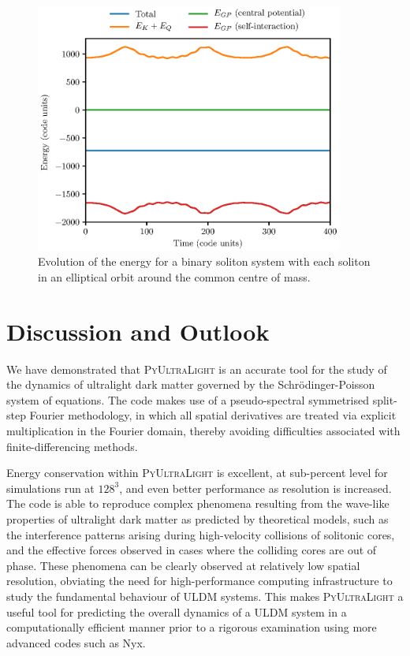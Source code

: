 \documentclass[a4paper,11pt]{article}
\newcommand{\PyUltraLight}{\textsc{PyUltraLight }}
\begin{document}
\begin{figure}
  \includegraphics[width=0.9\textwidth,trim=0 0 2cm 2cm,clip]{energy_diagram2}
  \caption{Evolution of the energy for a binary soliton system with each soliton in an elliptical orbit around the common centre of mass.}
  \label{fig:binary}
\end{figure}





\section{Discussion and Outlook}

We have demonstrated that \PyUltraLight is an accurate tool for the study of the dynamics of ultralight dark matter governed by the Schr{\"o}dinger-Poisson system of equations. The code makes use of a pseudo-spectral symmetrised split-step Fourier methodology, in which all spatial derivatives are treated via explicit multiplication in the Fourier domain, thereby avoiding difficulties associated with finite-differencing methods. 

Energy conservation within \PyUltraLight is excellent, at sub-percent level for simulations run at $128^3$, and even better performance as resolution is increased. The code is able to reproduce complex phenomena resulting from the wave-like properties of ultralight dark matter as predicted by theoretical models, such as the interference patterns arising during high-velocity collisions of solitonic cores, and the effective forces observed in cases where the colliding cores are out of phase. These phenomena can be clearly observed at relatively low spatial resolution, obviating the need for high-performance computing infrastructure to study the fundamental behaviour of ULDM systems. This makes \PyUltraLight a useful tool for predicting the overall dynamics of a ULDM system in a computationally efficient manner prior to a rigorous examination using more advanced codes such as Nyx.
\end{document}

